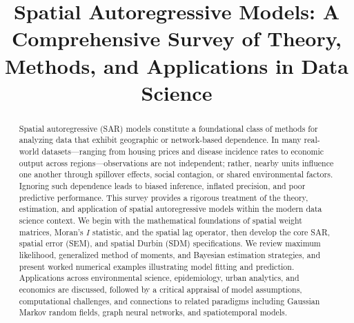\documentclass[conference]{IEEEtran}
\theoremstyle{definition}
\begin{document}
\title{Spatial Autoregressive Models: A Comprehensive Survey of Theory, Methods, and Applications in Data Science}

\author{
\and
{}
}

\maketitle

\begin{abstract}
Spatial autoregressive (SAR) models constitute a foundational class of methods for analyzing data that exhibit geographic or network-based dependence. In many real-world datasets---ranging from housing prices and disease incidence rates to economic output across regions---observations are not independent; rather, nearby units influence one another through spillover effects, social contagion, or shared environmental factors. Ignoring such dependence leads to biased inference, inflated precision, and poor predictive performance. This survey provides a rigorous treatment of the theory, estimation, and application of spatial autoregressive models within the modern data science context. We begin with the mathematical foundations of spatial weight matrices, Moran's $I$ statistic, and the spatial lag operator, then develop the core SAR, spatial error (SEM), and spatial Durbin (SDM) specifications. We review maximum likelihood, generalized method of moments, and Bayesian estimation strategies, and present worked numerical examples illustrating model fitting and prediction. Applications across environmental science, epidemiology, urban analytics, and economics are discussed, followed by a critical appraisal of model assumptions, computational challenges, and connections to related paradigms including Gaussian Markov random fields, graph neural networks, and spatiotemporal models.
\end{abstract}
\end{document}
